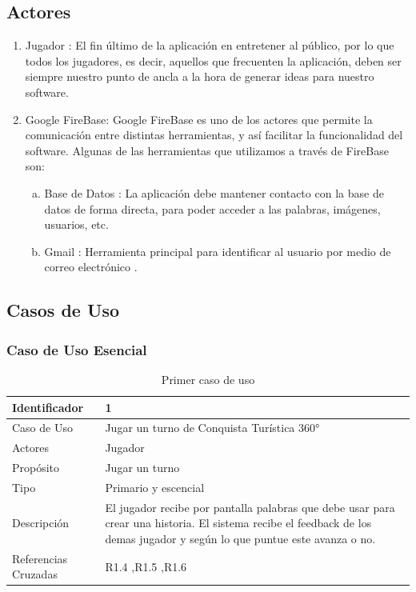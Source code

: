 \subsection{Actores}
\begin{enumerate}[1.]
	\item Jugador : El fin último de la aplicación en entretener al público, por lo que todos los jugadores, es decir, aquellos que frecuenten la aplicación, deben ser siempre nuestro punto de ancla a la hora de generar ideas para nuestro software.
	\item Google FireBase: Google FireBase es uno de los actores que permite la comunicación entre distintas herramientas, y así facilitar la funcionalidad del software. Algunas de las herramientas que utilizamos a través de FireBase son:
	\begin{enumerate}[a)]
		\item Base de Datos : La aplicación debe mantener contacto con la base de datos de forma directa, para poder acceder a las palabras, imágenes, usuarios, etc.
		\item Gmail : Herramienta principal para identificar al usuario por medio de correo electrónico .
	\end{enumerate} 
\end{enumerate}

\subsection{Casos de Uso}
\subsubsection{Caso de Uso Esencial}
\begin{table}[H]
    \begin{center}
        \begin{tabular}{| l | m{12cm} |}        
        	\hline 
        	Identificador & 1\\
        	\hline
        	Caso de Uso & Jugar un turno de Conquista Turística
360°\\
        	\hline
        	Actores & Jugador\\
        	\hline
        	Propósito & Jugar un turno\\
        	\hline
        	Tipo & Primario y escencial\\
        	\hline
        	Descripción & El jugador recibe por pantalla palabras que debe usar para crear una historia. El sistema recibe el feedback de los demas jugador y según lo que puntue este avanza o no.\\
        	\hline
        	Referencias Cruzadas & R1.4 ,R1.5 ,R1.6\\
        	\hline
        \end{tabular}
    \caption{Primer caso de uso}
    \end{center}
\end{table}

